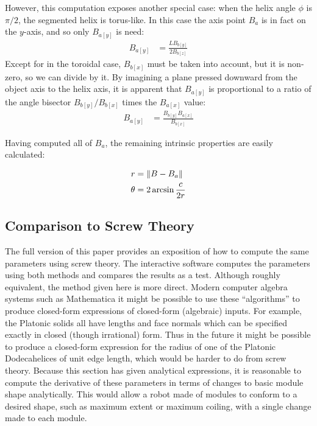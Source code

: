 \documentclass{svproc}
\DeclarePairedDelimiter{\norm}{\lVert}{\rVert}
\begin{document}
However, this computation exposes another special case: when the
helix angle $\phi$ is $\pi /2$, the segmented helix is
torus-like. In this case the axis point $B_a$ is in fact
on the $y$-axis, and so only $B_{a[y]}$ is need:
\begin{align}
  B_{a[y]} &=  \frac{L B_{b[y]}}{2 B_{b[z]}}
\end{align}
Except for in the toroidal case,  $B_{b[x]}$ must be taken into
account, but it is non-zero, so we can divide by it.
By imagining a plane pressed downward from the
object axis to the helix axis, it is apparent that $B_{a[y]}$
is proportional to a ratio of the angle bisector
$B_{b[y]}/B_{b[x]}$ times the $B_{a[x]}$ value:
\begin{align}
  B_{a[y]} &=  \frac{ B_{b[y]} B_{a[x]}}{ B_{b[x]}}
\end{align}

Having computed all of $B_a$, the remaining intrinsic properties are easily
calculated:

\begin{align}
  r &= \norm{B - B_a}  \\
  \theta &= 2 \arcsin{\frac{c}{2r}}
\end{align}

\subsection{Comparison to Screw Theory}

The full version of this paper\cite{readfullsegmentedhelix} provides an exposition of how to compute the same parameters
using screw theory. The interactive software computes the parameters using both methods and compares the results as a test.
Although roughly equivalent, the method given here is more direct.
Modern
computer algebra systems such as Mathematica\cite{Mathematica} it might be possible to use these ``algorithms'' to produce closed-form
expressions of closed-form (algebraic) inputs. For example, the Platonic solids all have lengths and face normals which
can be specified exactly in closed (though irrational) form.
Thus in the future it might be possible to produce a closed-form expression for the
radius of one of the Platonic Dodecahelices of unit edge length, which would be harder to do from screw theory.
Because this section has given analytical expressions, it is reasonable to compute the derivative of these
parameters in terms of changes to basic module shape analytically. This would allow a robot made of modules
to conform to a desired shape, such as maximum extent or maximum coiling, with a single change made
to each module.
\end{document}
